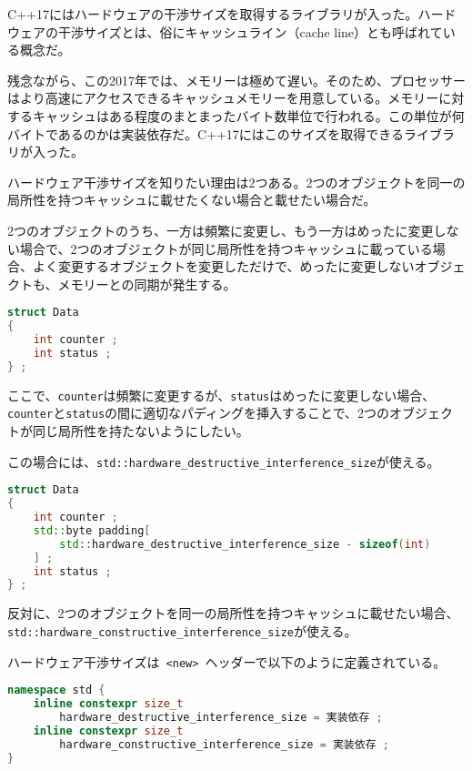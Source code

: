 %

C++17にはハードウェアの干渉サイズを取得するライブラリが入った。ハードウェアの干渉サイズとは、俗にキャッシュライン（cache
line）とも呼ばれている概念だ。

残念ながら、この2017年では、メモリーは極めて遅い。そのため、プロセッサーはより高速にアクセスできるキャッシュメモリーを用意している。メモリーに対するキャッシュはある程度のまとまったバイト数単位で行われる。この単位が何バイトであるのかは実装依存だ。C++17にはこのサイズを取得できるライブラリが入った。

ハードウェア干渉サイズを知りたい理由は2つある。2つのオブジェクトを同一の局所性を持つキャッシュに載せたくない場合と載せたい場合だ。

2つのオブジェクトのうち、一方は頻繁に変更し、もう一方はめったに変更しない場合で、2つのオブジェクトが同じ局所性を持つキャッシュに載っている場合、よく変更するオブジェクトを変更しただけで、めったに変更しないオブジェクトも、メモリーとの同期が発生する。

\begin{lstlisting}[language=C++]
struct Data
{
    int counter ;
    int status ;
} ;
\end{lstlisting}

ここで、\lstinline!counter!は頻繁に変更するが、\lstinline!status!はめったに変更しない場合、\lstinline!counter!と\lstinline!status!の間に適切なパディングを挿入することで、2つのオブジェクトが同じ局所性を持たないようにしたい。

この場合には、\lstinline!std::hardware_destructive_interference_size!が使える。

\begin{lstlisting}[language=C++]
struct Data
{
    int counter ;
    std::byte padding[
        std::hardware_destructive_interference_size - sizeof(int)
    ] ;
    int status ;
} ;
\end{lstlisting}

反対に、2つのオブジェクトを同一の局所性を持つキャッシュに載せたい場合、\lstinline!std::hardware_constructive_interference_size!が使える。

ハードウェア干渉サイズは~\lstinline!<new>!~ヘッダーで以下のように定義されている。

\begin{lstlisting}[language=C++]
namespace std {
    inline constexpr size_t
        hardware_destructive_interference_size = 実装依存 ;
    inline constexpr size_t
        hardware_constructive_interference_size = 実装依存 ;
}
\end{lstlisting}

